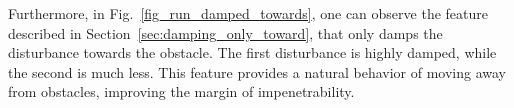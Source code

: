 


Furthermore, in Fig.~\ref{fig_run_damped_towards}, one can observe the feature described in Section~\ref{sec:damping_only_toward}, that only damps the disturbance towards the obstacle.
The first disturbance is highly damped, while the second is much less. This feature provides a natural behavior of moving away from obstacles, improving the margin of impenetrability. 




